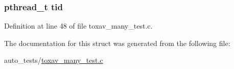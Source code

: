 \hypertarget{struct___a_call_a3a5ba243b3ab4b6093afb178de0f9509}{
\subsubsection[{tid}]{\setlength{\rightskip}{0pt plus 5cm}pthread\+\_\+t tid}}\label{struct___a_call_a3a5ba243b3ab4b6093afb178de0f9509}


Definition at line 48 of file toxav\+\_\+many\+\_\+test.\+c.



The documentation for this struct was generated from the following file\+:\begin{DoxyCompactItemize}
\item 
auto\+\_\+tests/\hyperlink{toxav__many__test_8c}{toxav\+\_\+many\+\_\+test.\+c}\end{DoxyCompactItemize}

